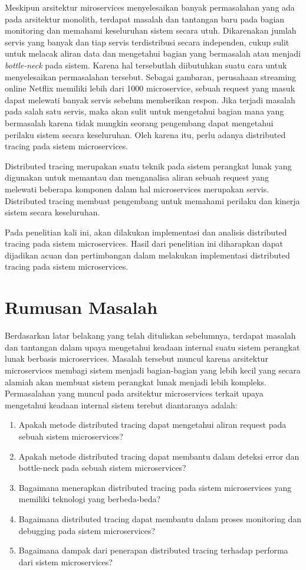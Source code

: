 Meskipun arsitektur miroservices menyelesaikan banyak permasalahan yang ada pada arsitektur monolith, terdapat masalah dan tantangan baru pada bagian monitoring dan memahami keseluruhan sistem secara utuh. Dikarenakan jumlah servis yang banyak dan tiap servis terdistribusi secara independen, cukup sulit untuk melacak aliran data dan mengetahui bagian yang bermasalah atau menjadi \emph{bottle-neck} pada sistem. Karena hal tersebutlah diibutuhkan suatu cara untuk menyelesaikan permasalahan tersebut. Sebagai gambaran, perusahaan streaming online Netflix memiliki lebih dari 1000 microservice\cite{NetflixMicroservices}, sebuah request yang masuk dapat melewati banyak servis sebelum memberikan respon. Jika terjadi masalah pada salah satu servis, maka akan sulit untuk mengetahui bagian mana yang bermasalah karena tidak mungkin seorang pengembang dapat mengetahui perilaku sistem secara keseluruhan. Oleh karena itu, perlu adanya distributed tracing pada sistem microservices.

Distributed tracing merupakan suatu teknik pada sistem perangkat lunak yang digunakan untuk memantau dan menganalisa aliran sebuah request yang melewati beberapa komponen dalam hal microservices merupakan servis. Distributed tracing membuat pengembang untuk memahami perilaku dan kinerja sistem secara keseluruhan.

Pada penelitian kali ini, akan dilakukan implementasi dan analisis distributed tracing pada sistem microservices. Hasil dari penelitian ini diharapkan dapat dijadikan acuan dan pertimbangan dalam melakukan implementasi distributed tracing pada sistem microservices.

\section{Rumusan Masalah}
Berdasarkan latar belakang yang telah dituliskan sebelumnya, terdapat masalah dan tantangan dalam upaya mengetahui keadaan internal suatu sistem perangkat lunak berbasis microservices. Masalah tersebut muncul karena arsitektur microservices membagi sistem menjadi bagian-bagian yang lebih kecil yang secara alamiah akan membuat sistem perangkat lunak menjadi lebih kompleks. Permasalahan yang muncul pada arsitektur microservices terkait upaya mengetahui keadaan internal sistem terebut diantaranya adalah:
\begin{enumerate}
\item Apakah metode distributed tracing dapat mengetahui aliran request pada sebuah sistem microservices?
\item Apakah metode distributed tracing dapat membantu dalam deteksi error dan bottle-neck pada sebuah sistem microservices?
\item Bagaimana menerapkan distributed tracing pada sistem microservices yang memiliki teknologi yang berbeda-beda?
\item Bagaimana distributed tracing dapat membantu dalam proses monitoring dan debugging pada sistem microservices?
\item Bagaimana dampak dari penerapan distributed tracing terhadap performa dari sistem microservices?
\end{enumerate}

